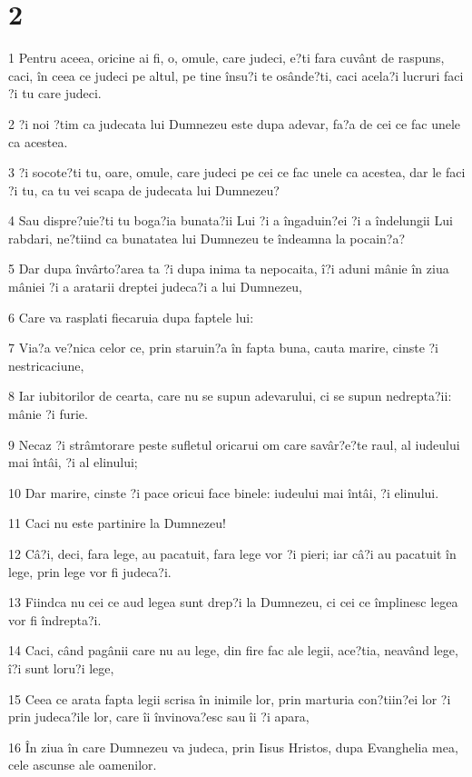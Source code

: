 \chapter{2}

\par 1 Pentru aceea, oricine ai fi, o, omule, care judeci, e?ti fara cuvânt de raspuns, caci, în ceea ce judeci pe altul, pe tine însu?i te osânde?ti, caci acela?i lucruri faci ?i tu care judeci.
\par 2 ?i noi ?tim ca judecata lui Dumnezeu este dupa adevar, fa?a de cei ce fac unele ca acestea.
\par 3 ?i socote?ti tu, oare, omule, care judeci pe cei ce fac unele ca acestea, dar le faci ?i tu, ca tu vei scapa de judecata lui Dumnezeu?
\par 4 Sau dispre?uie?ti tu boga?ia bunata?ii Lui ?i a îngaduin?ei ?i a îndelungii Lui rabdari, ne?tiind ca bunatatea lui Dumnezeu te îndeamna la pocain?a?
\par 5 Dar dupa învârto?area ta ?i dupa inima ta nepocaita, î?i aduni mânie în ziua mâniei ?i a aratarii dreptei judeca?i a lui Dumnezeu,
\par 6 Care va rasplati fiecaruia dupa faptele lui:
\par 7 Via?a ve?nica celor ce, prin staruin?a în fapta buna, cauta marire, cinste ?i nestricaciune,
\par 8 Iar iubitorilor de cearta, care nu se supun adevarului, ci se supun nedrepta?ii: mânie ?i furie.
\par 9 Necaz ?i strâmtorare peste sufletul oricarui om care savâr?e?te raul, al iudeului mai întâi, ?i al elinului;
\par 10 Dar marire, cinste ?i pace oricui face binele: iudeului mai întâi, ?i elinului.
\par 11 Caci nu este partinire la Dumnezeu!
\par 12 Câ?i, deci, fara lege, au pacatuit, fara lege vor ?i pieri; iar câ?i au pacatuit în lege, prin lege vor fi judeca?i.
\par 13 Fiindca nu cei ce aud legea sunt drep?i la Dumnezeu, ci cei ce împlinesc legea vor fi îndrepta?i.
\par 14 Caci, când pagânii care nu au lege, din fire fac ale legii, ace?tia, neavând lege, î?i sunt loru?i lege,
\par 15 Ceea ce arata fapta legii scrisa în inimile lor, prin marturia con?tiin?ei lor ?i prin judeca?ile lor, care îi învinova?esc sau îi ?i apara,
\par 16 În ziua în care Dumnezeu va judeca, prin Iisus Hristos, dupa Evanghelia mea, cele ascunse ale oamenilor.
